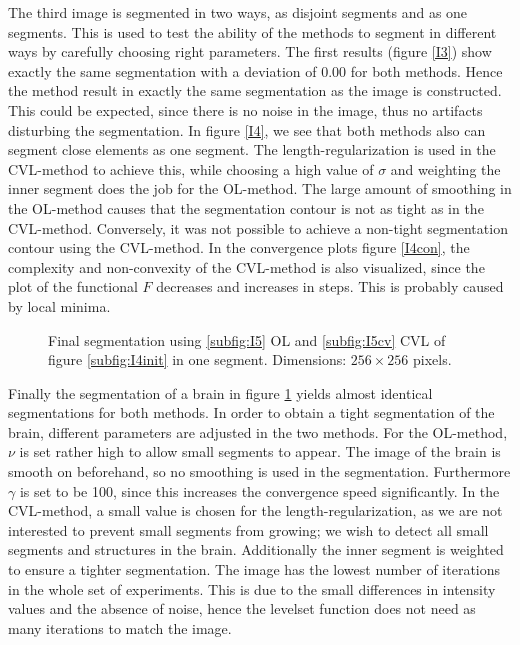 The third image is segmented in two ways, as disjoint segments and as one segments. This is used to test the ability of the methods to segment in different ways by carefully choosing right parameters. The first results (figure \ref{I3}) show exactly the same segmentation with a deviation of $0.00$ for both methods. Hence the method result in exactly the same segmentation as the image is constructed. This could be expected, since there is no noise in the image, thus no artifacts disturbing the segmentation. In figure \ref{I4}, we see that both methods also can segment close elements as one segment. The length-regularization is used in the CVL-method to achieve this, while choosing a high value of $\sigma$ and weighting the inner segment does the job for the OL-method. The large amount of smoothing in the OL-method causes that the segmentation contour is not as tight as in the CVL-method. Conversely, it was not possible to achieve a non-tight segmentation contour using the CVL-method. In the convergence plots figure \ref{I4con}, the complexity and non-convexity of the CVL-method is also visualized, since the plot of the functional $F$ decreases and increases in steps. This is probably caused by local minima.\\

\begin{figure}[h]
  \centering
  \caption{Final segmentation using \ref{subfig:I5} OL and \ref{subfig:I5cv} CVL of figure \ref{subfig:I4init} in one segment. Dimensions: $256\times 256$ pixels.}\label{I5}
\end{figure}

Finally the segmentation of a brain in figure \ref{I5} yields almost identical segmentations for both methods. In order to obtain a tight segmentation of the brain, different parameters are adjusted in the two methods. For the OL-method, $\nu$ is set rather high to allow small segments to appear. The image of the brain is smooth on beforehand, so no smoothing is used in the segmentation. Furthermore $\gamma$ is set to be 100, since this increases the convergence speed significantly. In the CVL-method, a small value is chosen for the length-regularization, as we are not interested to prevent small segments from growing; we wish to detect all small segments and structures in the brain. Additionally the inner segment is weighted to ensure a tighter segmentation. The image has the lowest number of iterations in the whole set of experiments. This is due to the small differences in intensity values and the absence of noise, hence the levelset function does not need as many iterations to match the image.\\

